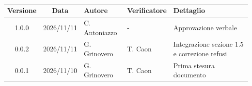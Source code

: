 \\[0.5cm]

\renewcommand{\arraystretch}{1.3}
\noindent\begin{tabularx}{\textwidth}{|c|c|>{\raggedright\arraybackslash}p{2.8cm}|>{\raggedright\arraybackslash}p{2.8cm}|X|}
    \hline
    \textbf{Versione} & \textbf{Data} & \textbf{Autore} & \textbf{Verificatore} & \textbf{Dettaglio} \\
    \hline
    1.0.0 & 2026/11/11 & C. Antoniazzo & - & Approvazione verbale \\
    \hline
    0.0.2 & 2026/11/11 & G. Grinovero & T. Caon & Integrazione sezione 1.5 e correzione refusi \\
    \hline
    0.0.1 & 2026/11/10 & G. Grinovero & T. Caon & Prima stesura documento \\
    \hline
\end{tabularx}
\newpage

